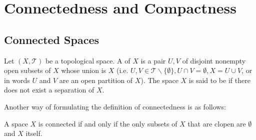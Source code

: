 %
%
%
\chapter{Connectedness and Compactness}
\label{ConnComp} %

\section{Connected Spaces}

\begin{definition}
    Let $(X,\mathcal{T})$ be a topological space. A  of $X$ is a pair $U,V$ of disjoint nonempty open subsets of $X$ whose union is $X$ (i.e. $U,V \in \mathcal{T}\backslash\{\emptyset\}, U\cap V = \emptyset, X = U\cup V$, or in words $U$ and $V$ are an open partition of $X$). The space $X$ is said to be  if there does not exist a separation of $X$.
\end{definition}

Another way of formulating the definition of connectedness is as follows:
\begin{center}
    A space $X$ is connected if and only if the only subsets of $X$ that are clopen are $\emptyset$ and $X$ itself.
\end{center}

